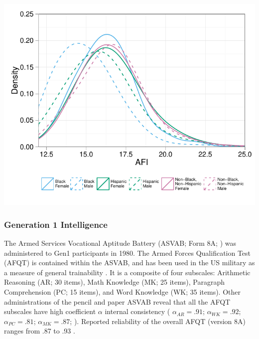\documentclass[a4paper,man,apacite,natbib,12pt,longtable]{apa6}\usepackage[]{graphicx}\usepackage[]{color}
\newenvironment{knitrout}{}{} %
\begin{document}
\noindent\begin{minipage}{\linewidth}
\label{plot_afi_by_race_sex}
\begin{center}
\begin{knitrout}
\color{fgcolor}
\includegraphics[width=.65\paperwidth]{figure/plot_afi_by_race_sex-1} 

\end{knitrout}
\end{center}
\end{minipage}
%
\subsubsection{Generation 1 Intelligence}
The Armed Services Vocational Aptitude Battery (ASVAB; Form 8A; \citealp{Palmer1988}) was administered to Gen1 participants in 1980. The Armed Forces Qualification Test (AFQT) is contained within the ASVAB, and has been used in the US military as a measure of general trainability \citep{maier1986asvab}. It is a composite of four subscales: Arithmetic Reasoning (AR; 30 items), Math Knowledge (MK; 25 items), Paragraph Comprehension (PC; 15 items), and Word Knowledge (WK; 35 items). Other administrations of the pencil and paper ASVAB reveal that all the AFQT subscales have high coefficient $\alpha$ internal consistency ( $\alpha_{AR} = .91$; $\alpha_{WK} = .92$; $\alpha_{PC} = .81$; $\alpha_{MK} = .87$; \citealp{kass1982}). Reported reliability of the overall AFQT (version 8A) ranges from .87 to .93 \citep{Palmer1988}.
\end{document}
